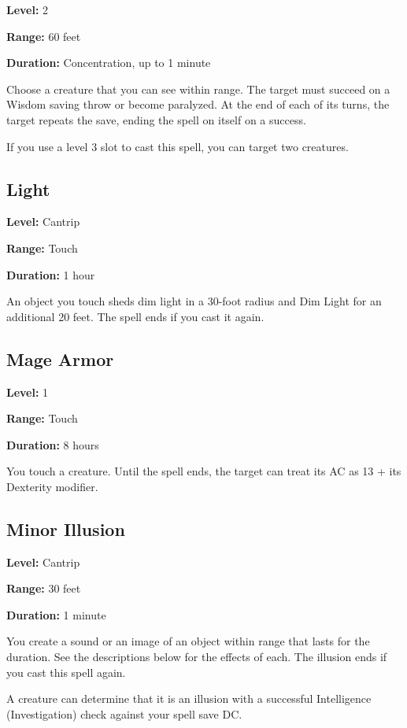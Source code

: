 \documentclass[12pt,letterpaper,twocolumn,openany,nodeprecatedcode,bg=none]{dndbook}
\let\oldsubsection\subsection
\renewcommand{\subsection}[1]{%
  \needspace{5\baselineskip}%
  \oldsubsection{#1}%
}
\begin{document}
\textbf{Level:} 2

\textbf{Range:} 60 feet

\textbf{Duration:} Concentration, up to 1 minute

Choose a creature that you can see within range. The target must succeed
on a Wisdom saving throw or become paralyzed. At the end of each of its
turns, the target repeats the save, ending the spell on itself on a
success.

If you use a level 3 slot to cast this spell, you can target two
creatures.

\subsection{Light}\label{light}

\textbf{Level:} Cantrip

\textbf{Range:} Touch

\textbf{Duration:} 1 hour

An object you touch sheds dim light in a 30-foot radius and Dim Light
for an additional 20 feet. The spell ends if you cast it again.

\subsection{Mage Armor}\label{mage-armor}

\textbf{Level:} 1

\textbf{Range:} Touch

\textbf{Duration:} 8 hours

You touch a creature. Until the spell ends, the target can treat its AC
as 13 + its Dexterity modifier.

\subsection{Minor Illusion}\label{minor-illusion}

\textbf{Level:} Cantrip

\textbf{Range:} 30 feet

\textbf{Duration:} 1 minute

You create a sound or an image of an object within range that lasts for
the duration. See the descriptions below for the effects of each. The
illusion ends if you cast this spell again.

A creature can determine that it is an illusion with a successful
Intelligence (Investigation) check against your spell save DC.
\end{document}
